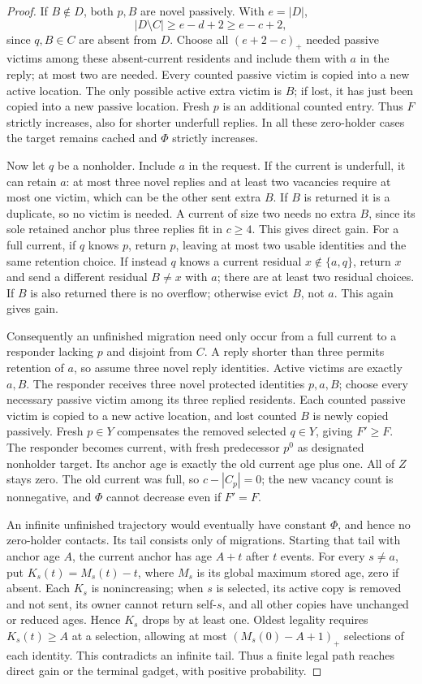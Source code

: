 \documentclass[11pt]{article}
\begin{document}
\begin{proof}
If $B\notin D$, both $p,B$ are novel passively. With $e=|D|$,
\[
 |D\setminus C|\ge e-d+2\ge e-c+2,
\]
since $q,B\in C$ are absent from $D$. Choose all
$(e+2-c)_+$ needed passive victims among these absent-current
residents and include them with $a$ in the reply; at most two
are needed. Every counted passive victim is copied into a new
active location. The only possible active extra victim is $B$;
if lost, it has just been copied into a new passive location.
Fresh $p$ is an additional counted entry. Thus $F$ strictly
increases, also for shorter underfull replies. In all these
zero-holder cases the target remains cached and $\Phi$
strictly increases.

Now let $q$ be a nonholder. Include $a$ in the request. If
the current is underfull, it can retain $a$: at most three
novel replies and at least two vacancies require at most one
victim, which can be the other sent extra $B$. If $B$ is
returned it is a duplicate, so no victim is needed. A current
of size two needs no extra $B$, since its sole retained anchor
plus three replies fit in $c\ge4$. This gives direct gain.
For a full current, if $q$ knows $p$, return $p$, leaving at
most two usable identities and the same retention choice.
If instead $q$ knows a current residual $x\notin\{a,q\}$,
return $x$ and send a different residual $B\ne x$ with $a$;
there are at least two residual choices. If $B$ is also
returned there is no overflow; otherwise evict $B$, not $a$.
This again gives gain.

Consequently an unfinished migration need only occur from a
full current to a responder lacking $p$ and disjoint from $C$.
A reply shorter than three permits retention of $a$, so assume
three novel reply identities. Active victims are exactly $a,B$.
The responder receives three novel protected identities $p,a,B$;
choose every necessary passive victim among its three replied
residents. Each counted passive victim is copied to a new active
location, and lost counted $B$ is newly copied passively. Fresh
$p\in Y$ compensates the removed selected $q\in Y$, giving
$F'\ge F$. The responder becomes current, with fresh predecessor
$p^0$ as designated nonholder target. Its anchor age is exactly
the old current age plus one. All of $Z$ stays zero. The old
current was full, so $c-|C_p|=0$; the new vacancy count is
nonnegative, and $\Phi$ cannot decrease even if $F'=F$.

An infinite unfinished trajectory would eventually have constant
$\Phi$, and hence no zero-holder contacts. Its tail consists
only of migrations. Starting that tail with anchor age $A$,
the current anchor has age $A+t$ after $t$ events. For every
$s\ne a$, put $K_s(t)=M_s(t)-t$, where $M_s$ is its global
maximum stored age, zero if absent. Each $K_s$ is nonincreasing;
when $s$ is selected, its active copy is removed and not sent,
its owner cannot return self-$s$, and all other copies have
unchanged or reduced ages. Hence $K_s$ drops by at least one.
Oldest legality requires $K_s(t)\ge A$ at a selection, allowing
at most $(M_s(0)-A+1)_+$ selections of each identity. This
contradicts an infinite tail. Thus a finite legal path reaches
direct gain or the terminal gadget, with positive probability.
\end{proof}
\end{document}
